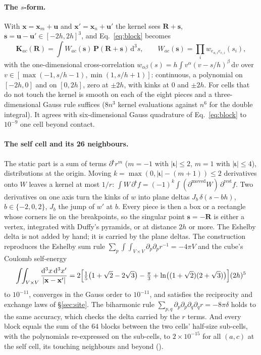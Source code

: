 \documentclass[11pt,a4paper]{article}
\newcommand{\bK}{\mathbf{K}}
\newcommand{\bP}{\mathbf{P}}
\newcommand{\dd}{\mathrm{d}}
\begin{document}
\paragraph{The $s$-form.} With $\mathbf{x}=\mathbf{x}_m+\mathbf{u}$ and $\mathbf{x}'=\mathbf{x}_n+\mathbf{u}'$
the kernel sees $\mathbf{R}+\mathbf{s}$, $\mathbf{s}=\mathbf{u}-\mathbf{u}'\in[-2h,2h]^3$, and
Eq.~\eqref{eq:block} becomes
\begin{equation}\label{eq:sform}
  \bK_{ac}(\mathbf{R})=\int W_{ac}(\mathbf{s})\,\bP(\mathbf{R}+\mathbf{s})\,\dd^3s,\qquad
  W_{ac}(\mathbf{s})=\prod_{i}w_{e_{a,i}e_{c,i}}(s_i),
\end{equation}
with the one-dimensional cross-correlation
$w_{\alpha\beta}(s)=h\int v^\alpha(v-s/h)^\beta\,\dd v$ over
$v\in[\max(-1,s/h-1),\min(1,s/h+1)]$: continuous, a polynomial on $[-2h,0]$ and on $[0,2h]$, zero at
$\pm2h$, with kinks at $0$ and $\pm2h$. For cells that do not touch the kernel is smooth on each of the
eight pieces and a three-dimensional Gauss rule suffices ($8n^3$ kernel evaluations against $n^6$ for the
double integral). It agrees with six-dimensional Gauss quadrature of Eq.~\eqref{eq:block} to $10^{-9}$ one
cell beyond contact.

\paragraph{The self cell and its 26 neighbours.} The static part is a sum of terms
$\partial^{\boldsymbol{\iota}}r^m$ ($m=-1$ with $|\boldsymbol{\iota}|\le2$, $m=1$ with
$|\boldsymbol{\iota}|\le4$), distributions at the origin. Moving
$k=\max(0,|\boldsymbol{\iota}|-(m+1))\le2$ derivatives onto $W$ leaves a kernel at most $1/r$:
$\int W\,\partial^{\boldsymbol{\iota}}f=(-1)^k\int(\partial^{\text{moved}}W)\,\partial^{\text{rest}}f$.
Two derivatives on one axis turn the kinks of $w$ into plane deltas $J_b\,\delta(s-bh)$,
$b\in\{-2,0,2\}$, $J_b$ the jump of $w'$ at $b$. Every piece is then a box or a rectangle whose corners
lie on the breakpoints, so the singular point $\mathbf{s}=-\mathbf{R}$ is either a vertex, integrated
with Duffy's pyramids, or at distance $2h$ or more. The Eshelby delta is not added by hand; it is carried by
the plane deltas. The construction reproduces the Eshelby sum rule
$\sum_p\int\!\!\int_{V\times V}\partial_p\partial_p r^{-1}=-4\pi V$ and the cube's Coulomb self-energy
\begin{equation}\label{eq:coulomb}
  \int\!\!\int_{V\times V}\frac{\dd^3x\,\dd^3x'}{|\mathbf{x}-\mathbf{x}'|}
  =2\Bigl[\tfrac15\bigl(1+\sqrt2-2\sqrt3\bigr)-\tfrac{\pi}{3}+\ln\bigl((1+\sqrt2)(2+\sqrt3)\bigr)\Bigr](2h)^5
\end{equation}
to $10^{-11}$, converges in the Gauss order to $10^{-11}$, and satisfies the reciprocity and exchange laws
of \S\ref{sec:site}. The biharmonic rule $\sum_{p,q}\partial_p\partial_p\partial_q\partial_q r=-8\pi\delta$
holds to the same accuracy, which checks the delta carried by the $r$ terms. And every block equals the
sum of the $64$ blocks between the two cells' half-size sub-cells, with the polynomials re-expressed on the
sub-cells, to $2\times10^{-15}$ for all $(a,c)$ at the self cell, its touching neighbours and beyond
().
\end{document}

